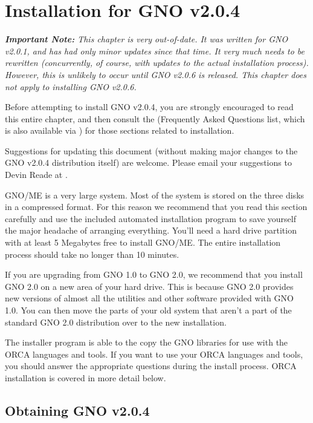 \documentclass{report}
\begin{document}
\chapter{Installation for GNO v2.0.4}

\em 
\textbf{Important Note:}
This chapter is very out-of-date.  It was written for GNO v2.0.1, and
has had only minor updates since that time.  It very much needs to
be rewritten (concurrently, of course, with updates to the actual
installation process).  However, this is unlikely to occur until
GNO v2.0.6 is released.  This chapter does not apply to installing
GNO v2.0.6.

Before attempting to install GNO v2.0.4, you are strongly encouraged to 
read this entire chapter, and then consult the 
 (Frequently Asked Questions list, which is also
available via ) for those sections related to installation.

Suggestions for updating this document (without making major changes
to the GNO v2.0.4 distribution itself) are welcome.  Please email
your suggestions to Devin Reade at .
\rm

GNO/ME is a very large system. Most of the
system is stored on the three disks in a compressed format. For
this reason we recommend that you read this section carefully and
use the included automated installation program to save yourself
the major headache of arranging everything. You'll need a hard
drive partition with at least 5 Megabytes free to install GNO/ME.
The entire installation process should take no longer than 10
minutes. 

If you are upgrading from GNO 1.0 to GNO
2.0, we recommend that you install GNO 2.0 on a new area of your
hard drive. This is because GNO 2.0 provides new versions of
almost all the utilities and other software provided with GNO
1.0. You can then move the parts of your old system that aren't a
part of the standard GNO 2.0 distribution over to the new
installation. 

The installer program is able to the copy
the GNO libraries for use with the ORCA languages and tools. If
you want to use your ORCA languages and tools, you should answer
the appropriate questions during the install process. ORCA
installation is covered in more detail below.

\section{Obtaining GNO v2.0.4}
\end{document}

